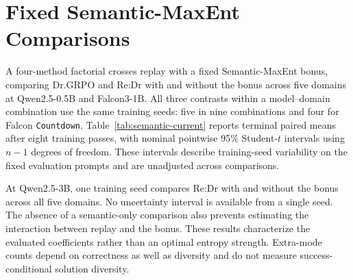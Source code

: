 \section{Fixed Semantic-MaxEnt Comparisons}
\label{app:semantic-current-factorial}
A four-method factorial crosses replay with a fixed Semantic-MaxEnt bonus,
comparing Dr.GRPO and Re:Dr with and without the bonus across five domains
at Qwen2.5-0.5B and Falcon3-1B. All three contrasts within a model--domain
combination use the same training seeds: five in nine combinations and four
for Falcon \texttt{Countdown}.
Table~\ref{tab:semantic-current} reports terminal paired means after eight
training passes, with nominal pointwise 95\% Student-$t$ intervals using
$n-1$ degrees of freedom. These intervals describe training-seed variability
on the fixed evaluation prompts and are unadjusted across comparisons.

At Qwen2.5-3B, one training seed compares Re:Dr with and without the bonus across
all five domains. No uncertainty interval is available from a single seed.
The absence of a semantic-only comparison also prevents estimating the
interaction between replay and the bonus. These results characterize the
evaluated coefficients rather than an optimal entropy strength. Extra-mode
counts depend on correctness as well as diversity and do not measure
success-conditional solution diversity.

